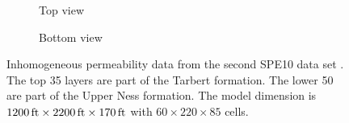 \begin{figure}[!ht]%
\centering%
\begin{subfigure}[b]{0.49\textwidth}%
\centering%
%
\caption{Top view}%
\label{fig:tarbert}%
\end{subfigure}%
\centering%
\begin{subfigure}[b]{0.49\textwidth}%
\centering%
%
\caption{Bottom view}%
\label{fig:upper_ness}%
\end{subfigure}%
\caption{Inhomogeneous permeability data from the second SPE10 data set \citep{spe10_2000}. The top 35 layers are part of the Tarbert formation. The lower 50 are part of the Upper Ness formation. The model dimension is  $\unit[1200]{ft} \times \unit[2200]{ft} \times \unit[170]{ft}$ with $60\times220\times85$ cells.}%
\label{fig:spe10_perm}%
\end{figure}%